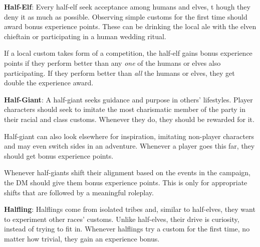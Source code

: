 
\textbf{Half-Elf}: Every half-elf seek acceptance among humans and elves, t hough they deny it as much as possible. Observing simple customs for the first time should award bonus experience points. These can be drinking the local ale with the elven chieftain or participating in a human wedding ritual.

If a local custom takes form of a competition, the half-elf gains bonus experience points if they perform better than any \emph{one} of the humans or elves also participating. If they perform better than \emph{all} the humans or elves, they get double the experience award.


\textbf{Half-Giant}: A half-giant seeks guidance and purpose in others' lifestyles. Player characters should seek to imitate the most charismatic member of the party in their racial and class customs. Whenever they do, they should be rewarded for it.

Half-giant can also look elsewhere for inspiration, imitating non-player characters and may even switch sides in an adventure. Whenever a player goes this far, they should get bonus experience points.

Whenever half-giants shift their alignment based on the events in the campaign, the DM should give them bonus experience points. This is only for appropriate shifts that are followed by a meaningful roleplay.


\textbf{Halfling}: Halflings come from isolated tribes and, similar to half-elves, they want to experiment other races' customs. Unlike half-elves, their drive is curiosity, instead of trying to fit in. Whenever halflings try a  custom for the first time, no matter how trivial, they gain an experience bonus.

